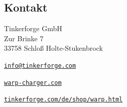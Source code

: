 \documentclass[a4paper,10pt]{article}
\begin{document}
\begin{multicols*}{2}
	\newpage

	\section{Kontakt}
	Tinkerforge GmbH\\ Zur Brinke 7\\ 33758 Schloß Holte-Stukenbrock
	\begin{description}[leftmargin=!,labelwidth=\widthof{\textbf{Website}}]
		\item[E-Mail] \href{mailto:info@tinkerforge.com}{\texttt{info@tinkerforge.com}}
		\item[Website] \href{https://warp-charger.com}{\texttt{warp-charger.com}}
		\item[Telefon] 
		\item[Shop] \href{https://tinkerforge.com/de/shop/warp.html}{\texttt{tinkerforge.com/de/shop/warp.html}}
	\end{description}


\end{multicols*}
\end{document}
